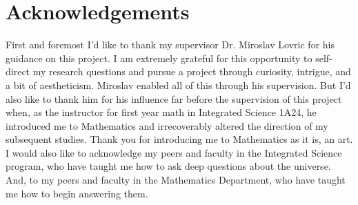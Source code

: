 \chapter*{Acknowledgements}
First and foremost I'd like to thank my supervisor Dr. Miroslav Lovric for his guidance on this project. I am extremely grateful for this opportunity to self-direct my research questions and pursue a project through curiosity, intrigue, and a bit of aestheticism. Miroslav enabled all of this through his supervision. But I'd also like to thank him for his influence far before the supervision of this project when, as the instructor for first year math in Integrated Science 1A24, he introduced me to Mathematics and irrecoverably altered the direction of my subsequent studies. Thank you for introducing me to Mathematics as it is, an art.\\
I would also like to acknowledge my peers and faculty in the Integrated Science program, who have taught me how to ask deep questions about the universe. And, to my peers and faculty in the Mathematics Department, who have taught me how to begin answering them.